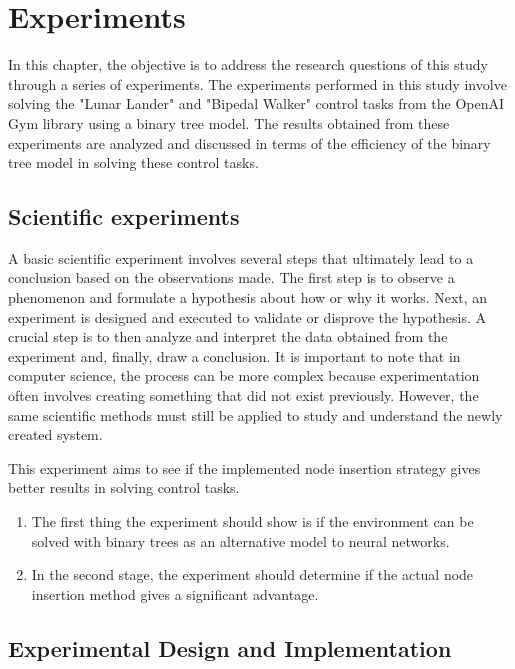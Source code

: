 \chapter{Experiments}
\label{ch:experiments}

In this chapter, the objective is to address the research questions of this study through a series of experiments. The experiments performed in this study involve solving the "Lunar Lander" and "Bipedal Walker" control tasks from the OpenAI Gym library using a binary tree model. The results obtained from these experiments are analyzed and discussed in terms of the efficiency of the binary tree model in solving these control tasks.

\section{Scientific experiments}
A basic scientific experiment involves several steps that ultimately lead to a conclusion based on the observations made. The first step is to observe a phenomenon and formulate a hypothesis about how or why it works. Next, an experiment is designed and executed to validate or disprove the hypothesis. A crucial step is to then analyze and interpret the data obtained from the experiment and, finally, draw a conclusion. It is important to note that in computer science, the process can be more complex because experimentation often involves creating something that did not exist previously. However, the same scientific methods must still be applied to study and understand the newly created system.

This experiment aims to see if the implemented node insertion strategy gives better results in solving control tasks.

\begin{enumerate}
\item The first thing the experiment should show is if the environment can be solved with binary trees as an alternative model to neural networks.
\item In the second stage, the experiment should determine if the actual node insertion method gives a significant advantage.
\end{enumerate}

\section{Experimental Design and Implementation}

